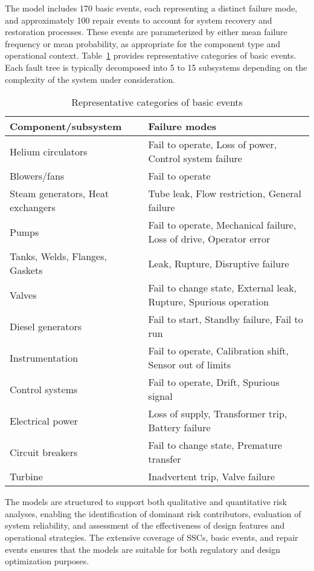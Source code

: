 The model includes 170 basic events, each representing a distinct failure mode, and approximately 100 repair events to account for system recovery and restoration processes. These events are parameterized by either mean failure frequency or mean probability, as appropriate for the component type and operational context. Table~\ref{tab:mhtgr-basic-event-types} provides representative categories of basic events. Each fault tree is typically decomposed into 5 to 15 subsystems depending on the complexity of the system under consideration.

\begin{table}[H]
    \centering
    \caption{Representative categories of basic events}
    \label{tab:mhtgr-basic-event-types}
    \begin{tabular}{p{6cm} p{10cm}}
        \toprule
        \textbf{Component/subsystem} & \textbf{Failure modes} \\
        \midrule
        Helium circulators & Fail to operate, Loss of power, Control system failure \\
        Blowers/fans & Fail to operate \\
        Steam generators, Heat exchangers & Tube leak, Flow restriction, General failure \\
        Pumps & Fail to operate, Mechanical failure, Loss of drive, Operator error \\
        Tanks, Welds, Flanges, Gaskets & Leak, Rupture, Disruptive failure \\
        Valves & Fail to change state, External leak, Rupture, Spurious operation \\
        Diesel generators & Fail to start, Standby failure, Fail to run \\
        Instrumentation & Fail to operate, Calibration shift, Sensor out of limits \\
        Control systems & Fail to operate, Drift, Spurious signal \\
        Electrical power & Loss of supply, Transformer trip, Battery failure \\
        Circuit breakers & Fail to change state, Premature transfer \\
        Turbine & Inadvertent trip, Valve failure \\
        \bottomrule
    \end{tabular}
\end{table}

The models are structured to support both qualitative and quantitative risk analyses, enabling the identification of dominant risk contributors, evaluation of system reliability, and assessment of the effectiveness of design features and operational strategies. The extensive coverage of SSCs, basic events, and repair events ensures that the models are suitable for both regulatory and design optimization purposes.
